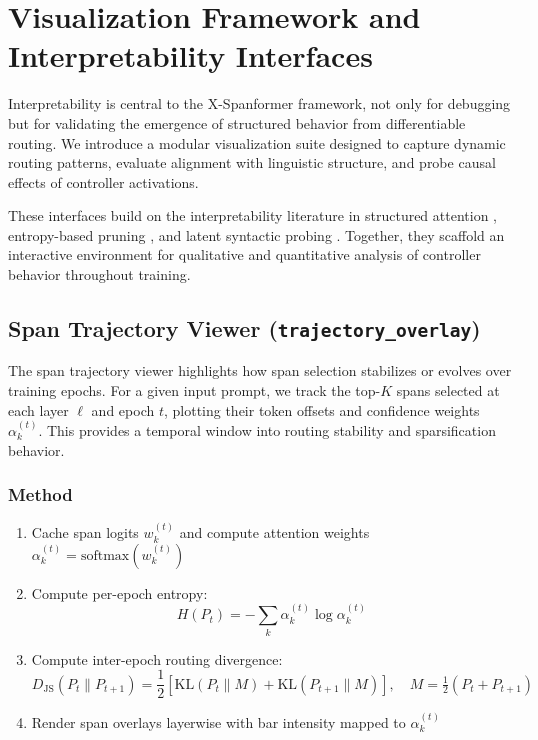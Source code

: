 \section{Visualization Framework and Interpretability Interfaces}
\label{sec:visualizations}

Interpretability is central to the X-Spanformer framework, not only for debugging but for validating the emergence of structured behavior from differentiable routing. We introduce a modular visualization suite designed to capture dynamic routing patterns, evaluate alignment with linguistic structure, and probe causal effects of controller activations.

These interfaces build on the interpretability literature in structured attention \cite{vig2019analyzing, hoover2020exbert}, entropy-based pruning \cite{grandvalet2006entropy, pereyra2017regularizing}, and latent syntactic probing \cite{linzen2016assessing, kim2019unsupervised}. Together, they scaffold an interactive environment for qualitative and quantitative analysis of controller behavior throughout training.

\subsection{Span Trajectory Viewer (\texttt{trajectory\_overlay})}
\label{sec:vis-traj}

The span trajectory viewer highlights how span selection stabilizes or evolves over training epochs. For a given input prompt, we track the top-$K$ spans selected at each layer \( \ell \) and epoch \( t \), plotting their token offsets and confidence weights \( \alpha_k^{(t)} \). This provides a temporal window into routing stability and sparsification behavior.

\subsubsection*{Method}

\begin{enumerate}[leftmargin=1.5em]
  \item Cache span logits \( w_k^{(t)} \) and compute attention weights \( \alpha_k^{(t)} = \mathrm{softmax}(w_k^{(t)}) \)
  \item Compute per-epoch entropy:
  \begin{equation}
    H(P_t) = - \sum_k \alpha_k^{(t)} \log \alpha_k^{(t)}
    \label{eq:entropy_viz}
  \end{equation}
  \item Compute inter-epoch routing divergence:
  \begin{equation}
    D_{\mathrm{JS}}(P_t \| P_{t+1}) = \frac{1}{2} \left[ \mathrm{KL}(P_t \| M) + \mathrm{KL}(P_{t+1} \| M) \right], \quad M = \tfrac{1}{2}(P_t + P_{t+1})
    \label{eq:jsdiv}
  \end{equation}
  \item Render span overlays layerwise with bar intensity mapped to \( \alpha_k^{(t)} \)
\end{enumerate}

